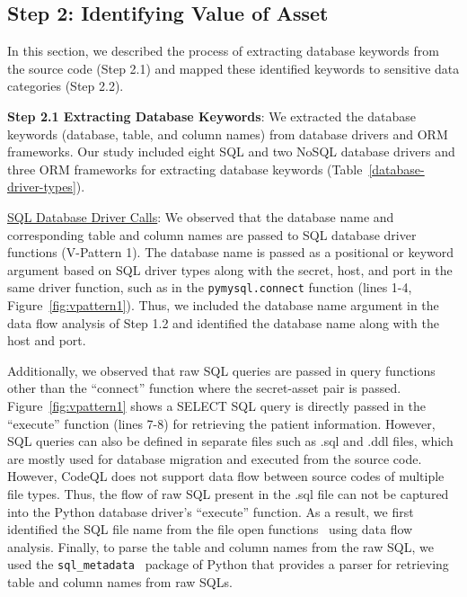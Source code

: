\subsection{Step 2: Identifying Value of Asset}
In this section, we described the process of extracting database keywords from the source code (Step 2.1) and mapped these identified keywords to sensitive data categories (Step 2.2).

\textbf{Step 2.1 Extracting Database Keywords}: We extracted the database keywords (database, table, and column names) from database drivers and ORM frameworks. Our study included eight SQL and two NoSQL database drivers and three ORM frameworks for extracting database keywords (Table~\ref{database-driver-types}).

\uline{SQL Database Driver Calls}: We observed that the database name and corresponding table and column names are passed to SQL database driver functions (V-Pattern 1). The database name is passed as a positional or keyword argument based on SQL driver types along with the secret, host, and port in the same driver function, such as in the \texttt{pymysql.connect} function (lines 1-4, Figure~\ref{fig:vpattern1}). Thus, we included the database name argument in the data flow analysis of Step 1.2 and identified the database name along with the host and port.

Additionally, we observed that raw SQL queries are passed in query functions other than the ``connect'' function where the secret-asset pair is passed. Figure~\ref{fig:vpattern1} shows a SELECT SQL query is directly passed in the ``execute'' function (lines 7-8) for retrieving the patient information. However, SQL queries can also be defined in separate files such as .sql and .ddl files, which are mostly used for database migration and executed from the source code. However, CodeQL does not support data flow between source codes of multiple file types. Thus, the flow of raw SQL present in the .sql file can not be captured into the Python database driver's ``execute'' function. As a result, we first identified the SQL file name from the file open functions~\cite{python-open} using data flow analysis. Finally, to parse the table and column names from the raw SQL, we used the \texttt{sql\_metadata}~\cite{sql-metadata} package of Python that provides a parser for retrieving table and column names from raw SQLs.




